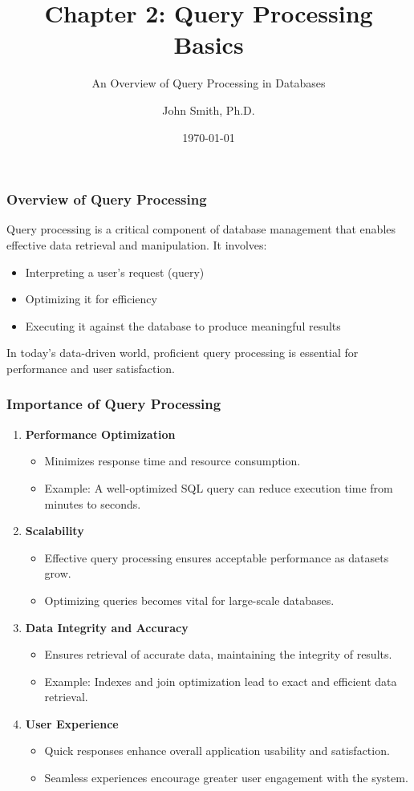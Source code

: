 \documentclass[aspectratio=169]{beamer}
\title[Chapter 2: Query Processing Basics]{Chapter 2: Query Processing Basics}
\subtitle{An Overview of Query Processing in Databases}
\author[J. Smith]{John Smith, Ph.D.}
\institute[University Name]{
  Department of Computer Science\\
  University Name\\
  \vspace{0.3cm}
  Email: email@university.edu\\
  Website: www.university.edu
}
\date{\today}
\begin{document}
\frame{\titlepage}

\begin{frame}
  \titlepage
\end{frame}

\begin{frame}[fragile]
  \frametitle{Overview of Query Processing}
  Query processing is a critical component of database management that enables effective data retrieval and manipulation. It involves:
  \begin{itemize}
    \item Interpreting a user's request (query)
    \item Optimizing it for efficiency
    \item Executing it against the database to produce meaningful results
  \end{itemize}
  In today’s data-driven world, proficient query processing is essential for performance and user satisfaction.
\end{frame}

\begin{frame}[fragile]
  \frametitle{Importance of Query Processing}
  \begin{enumerate}
    \item \textbf{Performance Optimization}
      \begin{itemize}
        \item Minimizes response time and resource consumption.
        \item Example: A well-optimized SQL query can reduce execution time from minutes to seconds.
      \end{itemize}
    \item \textbf{Scalability}
      \begin{itemize}
        \item Effective query processing ensures acceptable performance as datasets grow.
        \item Optimizing queries becomes vital for large-scale databases.
      \end{itemize}
    \item \textbf{Data Integrity and Accuracy}
      \begin{itemize}
        \item Ensures retrieval of accurate data, maintaining the integrity of results.
        \item Example: Indexes and join optimization lead to exact and efficient data retrieval.
      \end{itemize}
    \item \textbf{User Experience}
      \begin{itemize}
        \item Quick responses enhance overall application usability and satisfaction.
        \item Seamless experiences encourage greater user engagement with the system.
      \end{itemize}
  \end{enumerate}
\end{frame}
\end{document}

